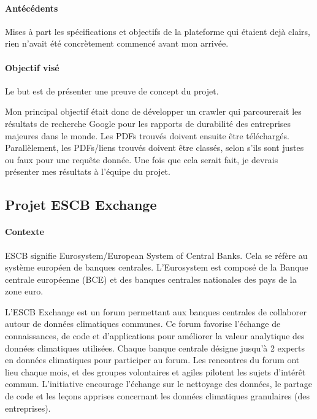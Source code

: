 \paragraph{Antécédents}

Mises à part les spécifications et objectifs de la plateforme qui étaient dejà clairs, rien n'avait été concrètement commencé avant mon arrivée.
\paragraph{Objectif visé}

Le but est de présenter une preuve de concept du projet.

Mon principal objectif était donc de développer un crawler qui parcourerait les résultats de recherche Google pour les rapports de durabilité des entreprises majeures dans le monde.
Les PDFs trouvés doivent ensuite être téléchargés. 
Parallèlement, les PDFs/liens trouvés doivent être classés, selon s'ils sont justes ou faux pour une requête donnée.
Une fois que cela serait fait, je devrais présenter mes résultats à l'équipe du projet.

\pagebreak
\subsection{Projet ESCB Exchange}

\paragraph{Contexte}

ESCB signifie Eurosystem/European System of Central Banks. Cela se réfère au système européen de banques centrales. 
L'Eurosystem est composé de la Banque centrale européenne (BCE) et des banques centrales nationales des pays de la zone euro. 

L'ESCB Exchange est un forum permettant aux banques centrales de collaborer autour de données climatiques communes. 
Ce forum favorise l'échange de connaissances, de code et d'applications pour améliorer la valeur analytique des données climatiques utilisées. 
Chaque banque centrale désigne jusqu'à 2 experts en données climatiques pour participer au forum. 
Les rencontres du forum ont lieu chaque mois, et des groupes volontaires et agiles pilotent les sujets d'intérêt commun. 
L'initiative encourage l'échange sur le nettoyage des données, le partage de code et les leçons apprises concernant les données climatiques granulaires (des entreprises).

